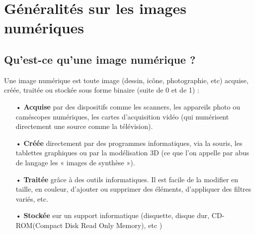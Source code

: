 \section{Généralités sur les images numériques}
    \subsection{Qu'est-ce qu'une image numérique ?}
    Une image numérique est toute image (dessin, icône, photographie, etc) acquise, créée, traitée ou stockée sous forme binaire (suite de 0 et de 1) :
    \begin{itemize}
        \item[•]\textbf{Acquise} par des dispositifs comme les scanners, les appareils photo ou caméscopes numériques, les cartes d’acquisition vidéo (qui numérisent directement une source comme la télévision).
        \item[•]\textbf{Créée} directement par des programmes informatiques, via la souris, les tablettes graphiques ou par la modélisation 3D (ce que l’on appelle par abus de langage les « images de synthèse »).
        \item[•]\textbf{Traitée} grâce à des outils informatiques. Il est facile de la modifier en taille, en couleur, d’ajouter ou supprimer des éléments, d’appliquer des filtres variés, etc.
        \item[•]\textbf{Stockée} sur un support informatique (disquette, disque dur, CD-ROM(Compact Disk Read Only Memory), etc ) \cite{wikiImage}
    \end{itemize}
